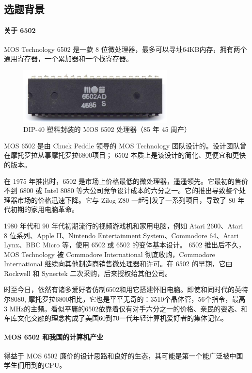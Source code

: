 \documentclass[cn,black,12pt,normal]{elegantnote}
\begin{document}
\newpage
\subsection{选题背景}

\paragraph{关于 6502} MOS Technology 6502 是一款 8 位微处理器，最多可以寻址64KB内存，拥有两个通用寄存器，一个累加器和一个栈寄存器。

\begin{figure}[H]
  \centering
  \includegraphics[width=0.7\textwidth]{image/MOS_6502AD_4585_top.jpeg}
  \caption{DIP-40 塑料封装的 MOS 6502 处理器（85 年 45 周产）}
\end{figure}

MOS 6502 是由 Chuck Peddle 领导的 MOS Technology 团队设计的。设计团队曾在摩托罗拉从事摩托罗拉6800项目； 6502 本质上是该设计的简化、更便宜和更快的版本。

在 1975 年推出时，6502 是市场上价格最低的微处理器，遥遥领先。它最初的售价不到 6800 或 Intel 8080 等大公司竞争设计成本的六分之一。它的推出导致整个处理器市场的价格迅速下降。它与 Zilog Z80 一起引发了一系列项目，导致了 80 年代初期的家用电脑革命。

1980 年代和 90 年代初期流行的视频游戏机和家用电脑，例如 Atari 2600、Atari 8 位系列、Apple II、Nintendo Entertainment System、Commodore 64、Atari Lynx、BBC Micro 等，使用 6502 或 6502 的变体基本设计。 6502 推出后不久，MOS Technology 被 Commodore International 彻底收购，Commodore International 继续向其他制造商销售微处理器和许可。在 6502 的早期，它由 Rockwell 和 Synertek 二次采购，后来授权给其他公司。

时至今日，依然有诸多爱好者仿制6502和用它搭建怀旧电脑。即使和同时代的英特尔8080, 摩托罗拉6800相比，它也是平平无奇的：3510个晶体管，56个指令，最高3 MHz的主频。看似平庸的6502依靠着仅有对手六分之一的价格、亲民的姿态、和车库文化交融的理念构成了美国60到70一代年轻计算机爱好者的集体记忆。

\paragraph{MOS 6502 和我国的计算机产业} 得益于 MOS 6502 廉价的设计思路和良好的生态，其可能是第一个能广泛被中国学生们用到的CPU。
\end{document}
